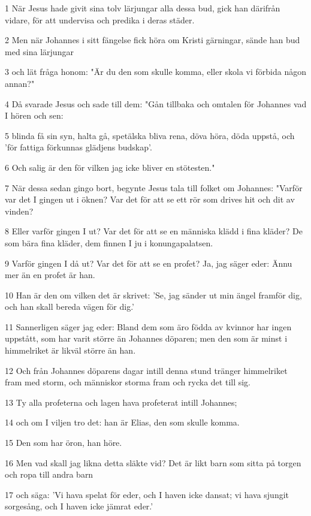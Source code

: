 \par 1 När Jesus hade givit sina tolv lärjungar alla dessa bud, gick han därifrån vidare, för att undervisa och predika i deras städer.
\par 2 Men när Johannes i sitt fängelse fick höra om Kristi gärningar, sände han bud med sina lärjungar
\par 3 och lät fråga honom: "Är du den som skulle komma, eller skola vi förbida någon annan?"
\par 4 Då svarade Jesus och sade till dem: "Gån tillbaka och omtalen för Johannes vad I hören och sen:
\par 5 blinda få sin syn, halta gå, spetälska bliva rena, döva höra, döda uppstå, och 'för fattiga förkunnas glädjens budskap'.
\par 6 Och salig är den för vilken jag icke bliver en stötesten."
\par 7 När dessa sedan gingo bort, begynte Jesus tala till folket om Johannes: "Varför var det I gingen ut i öknen? Var det för att se ett rör som drives hit och dit av vinden?
\par 8 Eller varför gingen I ut? Var det för att se en människa klädd i fina kläder? De som bära fina kläder, dem finnen I ju i konungapalatsen.
\par 9 Varför gingen I då ut? Var det för att se en profet? Ja, jag säger eder: Ännu mer än en profet är han.
\par 10 Han är den om vilken det är skrivet: 'Se, jag sänder ut min ängel framför dig, och han skall bereda vägen för dig.'
\par 11 Sannerligen säger jag eder: Bland dem som äro födda av kvinnor har ingen uppstått, som har varit större än Johannes döparen; men den som är minst i himmelriket är likväl större än han.
\par 12 Och från Johannes döparens dagar intill denna stund tränger himmelriket fram med storm, och människor storma fram och rycka det till sig.
\par 13 Ty alla profeterna och lagen hava profeterat intill Johannes;
\par 14 och om I viljen tro det: han är Elias, den som skulle komma.
\par 15 Den som har öron, han höre.
\par 16 Men vad skall jag likna detta släkte vid? Det är likt barn som sitta på torgen och ropa till andra barn
\par 17 och säga: 'Vi hava spelat för eder, och I haven icke dansat; vi hava sjungit sorgesång, och I haven icke jämrat eder.'
